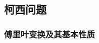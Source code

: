 \documentclass[10pt]{yerbaformat}
\begin{document}




\subsection{柯西问题}
\subsubsection{傅里叶变换及其基本性质}
\end{document}
